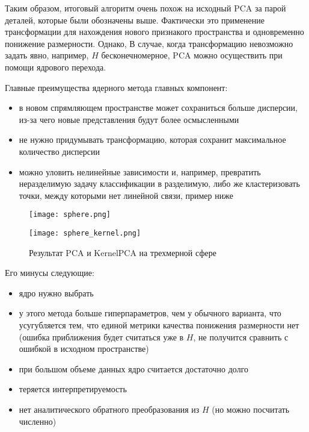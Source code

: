 \documentclass[12pt,fleqn]{article}
\begin{document}
Таким образом, итоговый алгоритм очень похож на исходный PCA за парой деталей, которые были обозначены выше. Фактически это применение трансформации для нахождения нового признакого пространства и одновременно понижение размерности. Однако, В случае, когда трансформацию невозможно задать явно, например, $H$ бесконечномерное, PCA можно осуществить при помощи ядрового перехода.

\vspace{2mm}

Главные преимущества ядерного метода главных компонент:
\begin{itemize}
    \item в новом спрямляющем пространстве может сохраниться больше дисперсии, из-за чего новые представления будут более осмысленными
    \item не нужно придумывать трансформацию, которая сохранит максимальное количество дисперсии
    \item можно уловить нелинейные зависимости и, например, превратить неразделимую задачу классификации в разделимую, либо же кластеризовать точки, между которыми нет линейной связи, пример ниже
\end{itemize}

\begin{figure}[h|t]
\centering
\begin{minipage}{0.36\textwidth}
  \centering
  \texttt{[image: sphere.png]}
  \label{fig:sub1}
\end{minipage}%
\begin{minipage}{0.36\textwidth}
  \centering
  \texttt{[image: sphere\_kernel.png]}
  \label{fig:sub2}
\end{minipage}
\caption{Результат PCA и KernelPCA на трехмерной сфере}
\label{fig:test}
\end{figure}

\break

Его минусы следующие:
\begin{itemize}
    \item ядро нужно выбрать
    \item у этого метода больше гиперпараметров, чем у обычного варианта, что усугубляется тем, что единой метрики качества понижения размерности нет (ошибка приближения будет считаться уже в $H$, не получится сравнить с ошибкой в исходном пространстве)
    \item при большом объеме данных ядро считается достаточно долго
    \item теряется интерпретируемость
    \item нет аналитического обратного преобразования из $H$ (но можно посчитать численно)
\end{itemize}
\end{document}
